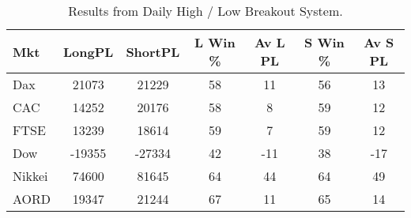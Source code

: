 \begin{table}[ht]
\centering
\caption[Daily High / Low Breakout System]{Results from Daily High / Low Breakout System.} 
\label{tab:hl_bout_sys}
\begin{tabular}{lcccccc}
  \toprule Mkt & LongPL & ShortPL & L Win \% & Av L PL & S Win \% & Av S PL \\ 
  \midrule Dax & 21073 & 21229 & 58 & 11 & 56 & 13 \\ 
  CAC & 14252 & 20176 & 58 & 8 & 59 & 12 \\ 
  FTSE & 13239 & 18614 & 59 & 7 & 59 & 12 \\ 
  Dow & -19355 & -27334 & 42 & -11 & 38 & -17 \\ 
  Nikkei & 74600 & 81645 & 64 & 44 & 64 & 49 \\ 
  AORD & 19347 & 21244 & 67 & 11 & 65 & 14 \\ 
   \bottomrule \end{tabular}
\end{table}
